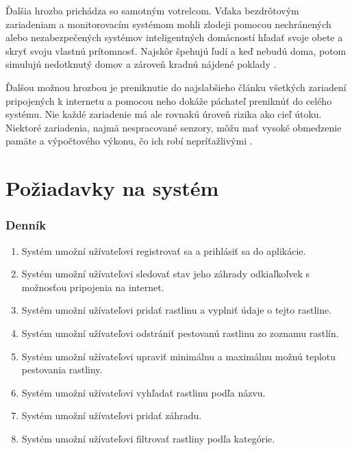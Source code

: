 \documentclass[twoside]{ctuthesis}
\theoremstyle{plain}
\theoremstyle{definition}
\theoremstyle{note}
\begin{document}
Ďalšia hrozba prichádza so samotným votrelcom. Vďaka bezdrôtovým zariadeniam a monitorovacím systémom mohli zlodeji pomocou nechránených alebo nezabezpečených systémov inteligentných domácností hľadať svoje obete a skryť svoju vlastnú prítomnosť. Najskôr špehujú ľudí a keď nebudú doma, potom simulujú nedotknutý domov a zároveň kradnú nájdené poklady \cite{threats}.
\newline

Ďalšou možnou hrozbou je preniknutie do najslabšieho článku všetkých zariadení pripojených k internetu a pomocou neho dokáže páchateľ preniknúť do celého systému.
Nie každé zariadenie má ale rovnakú úroveň rizika ako cieľ útoku. Niektoré zariadenia, najmä nespracované senzory, môžu mať vysoké obmedzenie pamäte a výpočtového výkonu, čo ich robí nepríťažlivými \cite{threats}.

\chapter{Požiadavky na systém}
\label{chap:requirements}

\subsection*{Denník}
\begin{enumerate}
\item Systém umožní užívateľovi registrovať sa a prihlásiť sa do aplikácie.
\item Systém umožní užívateľovi sledovať stav jeho záhrady odkiaľkoľvek s možnosťou pripojenia na internet.
\item Systém umožní užívateľovi pridať rastlinu a vyplniť údaje o tejto rastline.
\item Systém umožní užívateľovi odstrániť pestovanú rastlinu zo zoznamu rastlín.
\item Systém umožní užívateľovi upraviť minimálnu a maximálnu možnú teplotu pestovania rastliny.
\item Systém umožní užívateľovi vyhľadať rastlinu podľa názvu.
\item Systém umožní užívateľovi pridať záhradu.
\item Systém umožní užívateľovi filtrovať rastliny podľa kategórie.
\end{enumerate}
\end{document}
